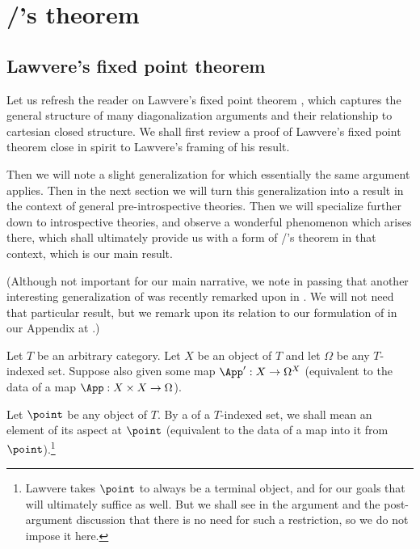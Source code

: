 \filestart

\section{\Loeb/'s theorem}

\subsection{Lawvere's fixed point theorem}
Let us refresh the reader on Lawvere's fixed point theorem \autocite{lawvere1969diagonal}, which captures the general structure of many diagonalization arguments and their relationship to cartesian closed structure. We shall first review a proof of Lawvere's fixed point theorem close in spirit to Lawvere's framing of his result.

Then we will note a slight generalization for which essentially the same argument applies. Then in the next section we will turn this generalization into a result in the context of general pre-introspective theories. Then we will specialize further down to introspective theories, and observe a wonderful  phenomenon which arises there, which shall ultimately provide us with a form of \Loeb/'s theorem in that context, which is our main result.

(Although not important for our main narrative, we note in passing that another interesting generalization of  was recently remarked upon in \autocite{roberts2021substructural}. We will not need that particular result, but we remark upon its relation to our formulation of  in our Appendix at .)

\label{LawveresFixedPointTheorem}
Let $T$ be an arbitrary category. Let $X$ be an object of $T$ and let $\Omega$ be any $T$-indexed set. Suppose also given some map $\App' : X \to \Omega^X$ (equivalent to the data of a map $\App : X \times X \to \Omega$).

Let $\point$ be any object of $T$. By a  of a $T$-indexed set, we shall mean an element of its aspect at $\point$ (equivalent to the data of a map into it from $\point$).\footnote{Lawvere takes $\point$ to always be a terminal object, and for our goals that will ultimately suffice as well. But we shall see in the argument and the post-argument discussion that there is no need for such a restriction, so we do not impose it here.}

